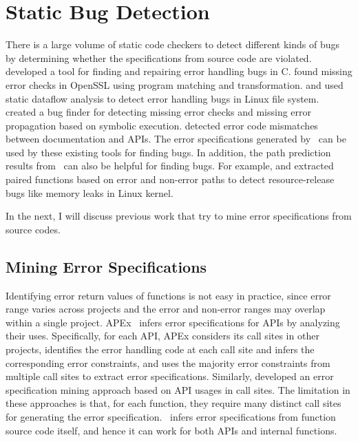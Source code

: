 \documentclass[12pt]{report}	%
\begin{document}
\section{Static Bug Detection}
\label{sec:review:bugdetector}

There is a large volume of static code checkers to 
detect different kinds of bugs by determining 
whether the specifications from source code are violated.
\cite{Tian:2017:ADR} developed a tool for finding 
and repairing error handling bugs in C.
\cite{lawall2010finding} found missing error checks in OpenSSL
using program matching and transformation.
\cite{gunawi2008eio} and \cite{Rubio-Gonzalez:2009:EPA:1542476.1542506} 
used static dataflow analysis to detect error handling bugs in Linux file system. 
\cite{jana2016automatically} created a bug finder for detecting missing error checks
and missing error propagation based on symbolic execution.
\cite{rubio2010expect} detected error code mismatches between documentation and APIs.
%
The error specifications generated by \newTool\
can be used by these existing tools
for finding bugs.
%
In addition, the path prediction results from \newTool\
can also be helpful for finding bugs.
For example, \cite{liu2014pf} and \cite{bai2015automated}
extracted paired functions based on error and non-error paths
to detect resource-release bugs like memory leaks in Linux kernel. 

In the next, I will discuss previous work that try to mine error specifications from source codes.

\subsection{Mining Error Specifications}

Identifying error return values of functions is not easy in practice,
since error range varies across projects
and the error and non-error ranges may overlap within a single project.
%
APEx~\cite{Kang:2016:AAI:2970276.2970354} infers error specifications for APIs
by analyzing their uses. Specifically, for each API, APEx 
considers its call sites in other projects,  
identifies the error handling code at each call site
and infers the corresponding error constraints,
and uses the majority error constraints from multiple call sites to extract error specifications.
%
Similarly, \cite{Acharya:2009:MAE}
developed an error specification mining approach based on API usages in call sites. 
The limitation in these approaches is that, for each function,
they require many distinct call sites for generating the error specification.
\newTool\ infers error specifications from function source code itself,
and hence it can work for both APIs and internal functions.
\end{document}
